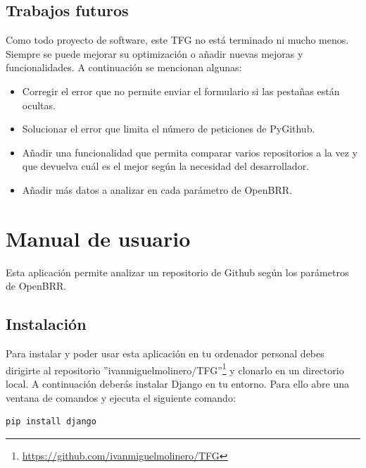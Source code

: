 \documentclass[a4paper, 12pt]{book}
\begin{document}
\section{Trabajos futuros}
\label{sec:trabajos_futuros}

Como todo proyecto de software, este TFG no está terminado ni mucho menos. Siempre se puede mejorar su optimización o añadir nuevas mejoras y funcionalidades. A continuación se mencionan algunas:

\begin{itemize}
	\item Corregir el error que no permite enviar el formulario si las pestañas están ocultas.
	\item Solucionar el error que limita el número de peticiones de PyGithub.
	\item Añadir una funcionalidad que permita comparar varios repositorios a la vez y que devuelva cuál es el mejor según la necesidad del desarrollador.
	\item Añadir más datos a analizar en cada parámetro de OpenBRR.
\end{itemize}



\cleardoublepage
\appendix
\chapter{Manual de usuario}
\label{app:manual}

Esta aplicación permite analizar un repositorio de Github según los parámetros de OpenBRR.

\section{Instalación}

Para instalar y poder usar esta aplicación en tu ordenador personal debes dirigirte al repositorio ''ivanmiguelmolinero/TFG''\footnote{\url{https://github.com/ivanmiguelmolinero/TFG}} y clonarlo en un directorio local. A continuación deberás instalar Django en tu entorno. Para ello abre una ventana de comandos y ejecuta el siguiente comando:

\begin{verbatim}
pip install django
\end{verbatim}
\end{document}
